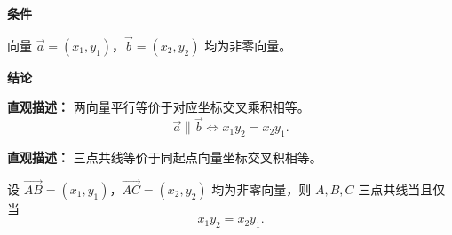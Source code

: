 \begin{statementbox}
	\textbf{\textcolor{CStatement}{条件}}
	\begin{description}[style=nextline, leftmargin=2.8em, labelsep=0.5em, itemsep=0.35em]
		\item[\textbf{\textcolor{CStatement}{条件1（非零向量）：}}] 向量 $\vec{a}=(x_1,y_1)$，$\vec{b}=(x_2,y_2)$ 均为非零向量。
	\end{description}

	\textbf{\textcolor{CStatement}{结论}}
	\begin{description}[style=nextline, leftmargin=2.8em, labelsep=0.5em, itemsep=0.45em]
		\item[\textbf{\textcolor{CStatement}{结论一（坐标判定）：}}]
			\textbf{\textcolor{CStatement}{直观描述：}}
			两向量平行等价于对应坐标交叉乘积相等。
			\[
				\vec{a}\parallel\vec{b} \iff x_1y_2 = x_2y_1.
			\]
		\item[\textbf{\textcolor{CStatement}{推广结论（三点共线）：}}]
			\textbf{\textcolor{CStatement}{直观描述：}}
			三点共线等价于同起点向量坐标交叉积相等。
			\par
			设 $\overrightarrow{AB}=(x_1,y_1)$，$\overrightarrow{AC}=(x_2,y_2)$ 均为非零向量，则 $A,B,C$ 三点共线当且仅当
			\[
				x_1y_2 = x_2y_1.
			\]
	\end{description}
\end{statementbox}
